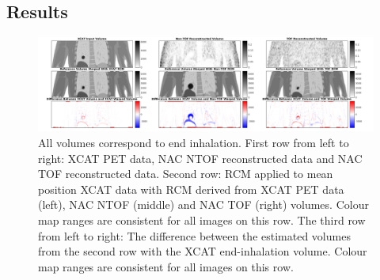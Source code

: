         \subsection{Results} \label{impact_of_tof_on_respiratory_motion_modelling_using_nac_pet_results}
            \begin{figure}
                \centering
                
                \includegraphics[width=1.0\linewidth]{figures/output.png}
                
                \captionsetup{singlelinecheck=false, justification=raggedright}
                \caption{All volumes correspond to end inhalation. First row from left to right: \gls{XCAT} \gls{PET} data, \gls{NAC} \gls{NTOF} reconstructed data and \gls{NAC} \gls{TOF} reconstructed data. Second row: \gls{RCM} applied to mean position \gls{XCAT} data with \gls{RCM} derived from \gls{XCAT} \gls{PET} data (left), \gls{NAC} \gls{NTOF} (middle) and \gls{NAC} \gls{TOF} (right) volumes. Colour map ranges are consistent for all images on this row. The third row from left to right: The difference between the estimated volumes from the second row with the \gls{XCAT} end-inhalation volume. Colour map ranges are consistent for all images on this row.} \label{fig:output}
            \end{figure}
            
